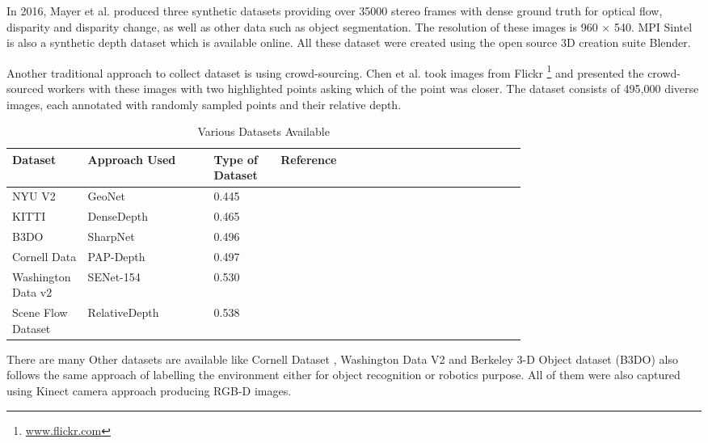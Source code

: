 In 2016, Mayer et al. \cite{MIFDB16} produced three synthetic datasets providing over 35000 stereo frames with dense ground truth for optical flow, disparity and disparity change, as well as other data such as object segmentation. The resolution of these images is 960 $\times$ 540. MPI Sintel \cite{Butler:ECCV:2012} is also a synthetic depth dataset which is available online. All these dataset were created using the open source 3D creation suite Blender.

Another traditional approach to collect dataset is using crowd-sourcing. Chen et al. \cite{DBLP:journals/corr/ChenFYD16} took images from Flickr \footnote{ \url{www.flickr.com}}  and presented the crowd-sourced workers with these images with two highlighted points asking which of the point was closer. The dataset consists of 495,000 diverse images, each annotated with randomly sampled points and their relative depth. 

\begin{table}[t]
\centering
\begin{tabular}{p{0.05\linewidth}p{0.2\linewidth}p{0.1\linewidth}p{0.24\linewidth}p{0.15\linewidth}}


\hline
\textbf{Dataset } & \textbf{Approach Used} & \textbf{Type of Dataset} & \textbf{Reference} \\ \hline\hline
NYU V2              & GeoNet          & 0.445               &  \cite{qi2018geonet}          \\ \hline
KITTI              & DenseDepth      & 0.465                &  \cite{Alhashim2018}         \\ \hline
B3DO              & SharpNet        & 0.496              &  \cite{ramamonjisoa2019sharpnet}\\ \hline
Cornell Data              & PAP-Depth       & 0.497            &  \cite{Zhang_2019_CVPR}         \\ \hline
Washington Data v2              & SENet-154       & 0.530               &  \cite{hu2019revisiting}          \\ \hline
Scene Flow Dataset              & RelativeDepth   & 0.538               &  \cite{lee2019monocular}          \\ \hline
\end{tabular}

\caption{Various Datasets Available}
\label{table:Datasets}

\end{table}

There are many Other datasets are available like Cornell Dataset \cite{3Dscene} , Washington Data V2 \cite{Washington} and  Berkeley 3-D Object dataset (B3DO) \cite{Janoch:EECS-2012-85} also follows the same approach of labelling the environment either for object recognition or robotics purpose. All of them were also captured using Kinect camera approach producing RGB-D images.



